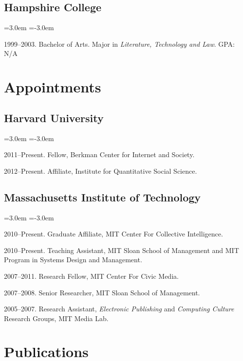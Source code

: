 \documentclass[11pt]{article}
\newenvironment{cvlist}{
\begin{list}{}{\leftmargin=3.0em \itemindent=-3.0em}
  \setlength{\itemsep}{0pt}
  \setlength{\parskip}{0em}
  \setlength{\parsep}{1em}
  \setlength{\parindent}{0em}}
{\vspace{1em}
\end{list}}
\begin{document}
\subsection{Hampshire College}
\begin{cvlist}
\item 1999--2003. Bachelor of Arts. Major in \emph{Literature,
    Technology and Law}. GPA: N/A
\end{cvlist}

\section{Appointments}

\subsection{Harvard University}
\begin{cvlist}
\item 2011--Present. Fellow, Berkman Center for Internet and Society.
\item 2012--Present. Affiliate, Institute for Quantitative Social Science.
\end{cvlist}

\subsection{Massachusetts Institute of Technology}
\begin{cvlist}
\item 2010--Present. Graduate Affiliate, MIT Center For Collective Intelligence.
\item 2010--Present. Teaching Assistant, MIT Sloan School of Management
  and MIT Program in Systems Design and Management.
\item 2007--2011. Research Fellow, MIT Center For Civic Media.
\item 2007--2008. Senior Researcher, MIT Sloan School of Management.
\item 2005--2007. Research Assistant, \emph{Electronic Publishing}
  and \emph{Computing Culture} Research Groups, MIT Media Lab.
\end{cvlist}

\section{Publications}
\end{document}
